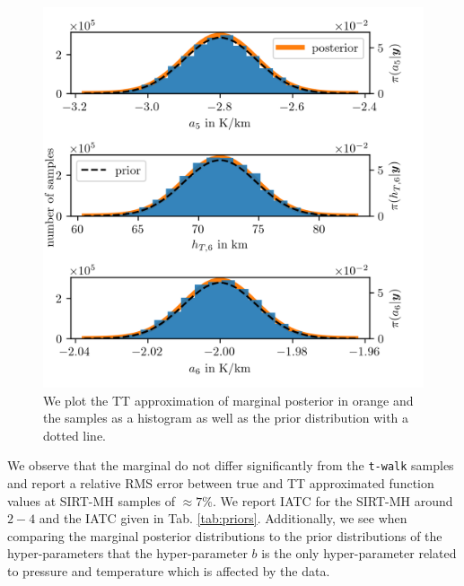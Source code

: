 \begin{figure}[ht!]
	\centering
	\includegraphics{PHdPTPost5.png}
	\caption[Histograms and TT approximation of posterior distribution as well as hyper-prior distribution.]{We plot the TT approximation of marginal posterior in orange and the samples as a histogram as well as the prior distribution with a dotted line.}
	\label{fig:PostHistTT5}
\end{figure}


We observe that the marginal do not differ significantly from the \texttt{t-walk} samples and report a relative RMS error between true and TT approximated function values at SIRT-MH samples of $\approx 7 \%$.
We report IATC for the SIRT-MH around $2-4$ and the IATC given in Tab. \ref{tab:priors}.
Additionally, we see when comparing the marginal posterior distributions to the prior distributions of the hyper-parameters that the hyper-parameter $b$ is the only hyper-parameter related to pressure and temperature which is affected by the data.
\clearpage


